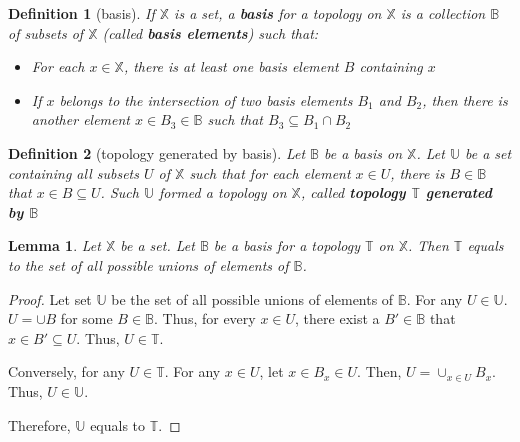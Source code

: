 \documentclass[twoside]{article}
\newtheorem{definition}{Definition}[section]
\newtheorem{lemma}{Lemma}[section]
\newcommand{\textmathbb}[1]{$ \mathbb{#1} $}
\newcommand{\defineNewWorld}[1]{\textit{\textbf{#1}}}
\begin{document}
            \begin{definition}[basis]
                  If $ \mathbb{X} $ is a set, a \defineNewWorld{basis} for a topology on \textmathbb{X} is a collection \textmathbb{B} of subsets of \textmathbb{X} (called \defineNewWorld{basis elements}) such that:
                  \begin{itemize}
                        \item For each $ x \in \mathbb{X} $, there is at least one basis element $ B $ containing $ x $
                        \item If $ x $ belongs to the intersection of two basis elements $ B_{1} $ and $ B_{2} $, then there is another element $ x \in B_{3} \in \mathbb{B} $ such that $ B_{3} \subseteq B_{1} \cap B_{2} $
                  \end{itemize}
            \end{definition}

            \begin{definition}[topology generated by basis]
                  Let \textmathbb{B} be a basis on \textmathbb{X}. Let \textmathbb{U} be a set containing all subsets $ U $ of \textmathbb{X} such that for each element $ x \in U $, there is $ B \in \mathbb{B} $ that $ x \in B \subseteq U $.
                  Such \textmathbb{U} formed a topology on \textmathbb{X}, called \defineNewWorld{topology \textmathbb{T} generated by \textmathbb{B}}
            \end{definition}
            
            \begin{lemma}
                  Let \textmathbb{X} be a set. Let \textmathbb{B} be a basis for a topology \textmathbb{T} on \textmathbb{X}. Then \textmathbb{T} equals to the set of all possible unions of elements of \textmathbb{B}.
            \end{lemma}

            \begin{proof}
                  Let set \textmathbb{U} be the set of all possible unions of elements of \textmathbb{B}. For any $ U \in \mathbb{U} $. $ U = \cup B $  for some $ B \in \mathbb{B} $. Thus, for every $ x \in U $, there exist a $ B' \in \mathbb{B} $ that $ x \in B' \subseteq U $. Thus, $ U \in \mathbb{T} $.

                  Conversely, for any $ U \in \mathbb{T} $. For any $ x \in U $, let $ x \in B_{x} \in U $. Then, $ U = \cup_{x \in U}B_{x} $. Thus, $ U \in \mathbb{U} $.

                  Therefore, \textmathbb{U} equals to \textmathbb{T}.
            \end{proof}
\end{document}
